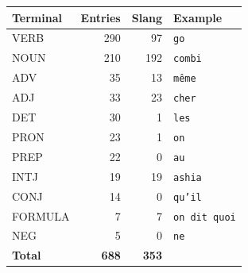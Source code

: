 \begin{tabular}{@{}lrrl@{}}
\toprule
\textbf{Terminal} & \textbf{Entries} & \textbf{Slang} & \textbf{Example} \\
\midrule
VERB & 290 & 97 & \texttt{go} \\
NOUN & 210 & 192 & \texttt{combi} \\
ADV & 35 & 13 & \texttt{même} \\
ADJ & 33 & 23 & \texttt{cher} \\
DET & 30 & 1 & \texttt{les} \\
PRON & 23 & 1 & \texttt{on} \\
PREP & 22 & 0 & \texttt{au} \\
INTJ & 19 & 19 & \texttt{ashia} \\
CONJ & 14 & 0 & \texttt{qu'il} \\
FORMULA & 7 & 7 & \texttt{on dit quoi} \\
NEG & 5 & 0 & \texttt{ne} \\
\midrule
\textbf{Total} & \textbf{688} & \textbf{353} & \\
\bottomrule
\end{tabular}
